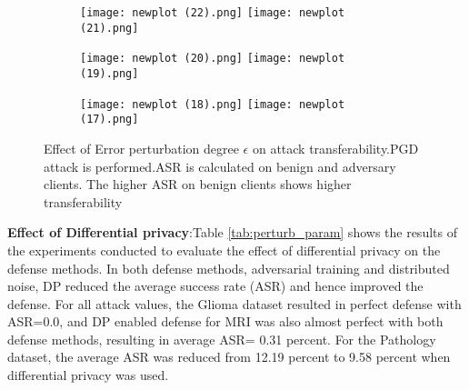 \begin{figure*}[t!]
    \centering
     \begin{subfigure}
         \centering
         \texttt{[image: newplot (22).png]}\hspace{-60pt} \texttt{[image: newplot (21).png]}
         \label{fig:AASR benign-EPS}
     \end{subfigure}
        \begin{subfigure}
         \centering
       \texttt{[image: newplot (20).png]}\hspace{-60pt} \texttt{[image: newplot (19).png]}
         \label{fig:AASR benign-EPS}
     \end{subfigure}
     
      \centering
     \begin{subfigure}
         \centering
    \texttt{[image: newplot (18).png]}\hspace{-60pt} \texttt{[image: newplot (17).png]}
         \label{fig:AASR benign-EPS}
     \end{subfigure}
     \hfill
        \caption{Effect of Error perturbation degree $\epsilon$ on attack transferability.PGD attack is performed.ASR is calculated on benign and adversary clients. The higher ASR on benign clients shows higher transferability}
        \label{fig: epsilon graphs}
\end{figure*}



\textbf{Effect of Differential privacy}:Table \ref{tab:perturb_param} shows the results of the experiments conducted to evaluate the effect of differential privacy on the defense methods. In both defense methods, adversarial training and distributed noise, DP reduced the average success rate (ASR) and hence improved the defense. For all attack values, the Glioma dataset resulted in perfect defense with ASR=0.0, and DP enabled defense for MRI was also almost perfect with both defense methods, resulting in average ASR= 0.31 percent. For the Pathology dataset, the average ASR was reduced from 12.19 percent to 9.58 percent when differential privacy was used. 

